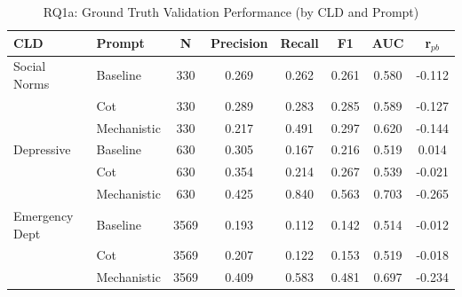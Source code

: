 \begin{table}[htbp]
\centering
\caption{RQ1a: Ground Truth Validation Performance (by CLD and Prompt)}
\label{tab:rq1a_gt_main}
\begin{tabular}{llcccccc}
\toprule
\textbf{CLD} & \textbf{Prompt} & \textbf{N} & \textbf{Precision} & \textbf{Recall} & \textbf{F1} & \textbf{AUC} & \textbf{r$_{pb}$} \\
\midrule
Social Norms & Baseline & 330 & 0.269 & 0.262 & 0.261 & 0.580 & -0.112 \\
 & Cot & 330 & 0.289 & 0.283 & 0.285 & 0.589 & -0.127 \\
 & Mechanistic & 330 & 0.217 & 0.491 & 0.297 & 0.620 & -0.144 \\
\midrule
Depressive & Baseline & 630 & 0.305 & 0.167 & 0.216 & 0.519 & 0.014 \\
 & Cot & 630 & 0.354 & 0.214 & 0.267 & 0.539 & -0.021 \\
 & Mechanistic & 630 & 0.425 & 0.840 & 0.563 & 0.703 & -0.265 \\
\midrule
Emergency Dept & Baseline & 3569 & 0.193 & 0.112 & 0.142 & 0.514 & -0.012 \\
 & Cot & 3569 & 0.207 & 0.122 & 0.153 & 0.519 & -0.018 \\
 & Mechanistic & 3569 & 0.409 & 0.583 & 0.481 & 0.697 & -0.234 \\
\midrule
\bottomrule
\end{tabular}
\end{table}